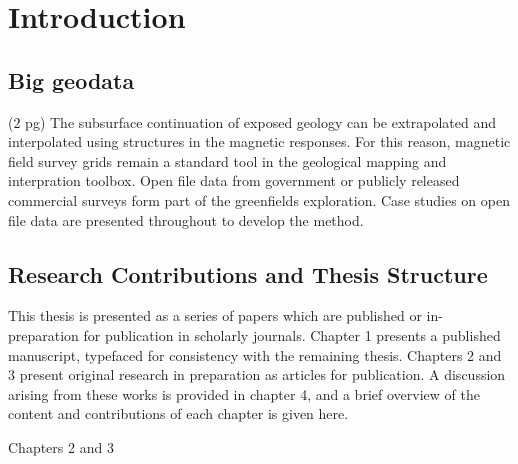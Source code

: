 \documentclass[manuscript.tex]{subfiles}
\begin{document}
\section{Introduction} %
\subsection{Big geodata}
(2 pg)
The subsurface continuation of exposed geology can be extrapolated and interpolated using structures in the magnetic responses.
For this reason, magnetic field survey grids remain a standard tool in the geological mapping and interpration toolbox. 
Open file data from government or publicly released commercial surveys form part of the greenfields exploration.
Case studies on open file data are presented throughout to develop the method.


\subsection{Research Contributions and Thesis Structure}
This thesis is presented as a series of papers which are published or in-preparation for publication in scholarly journals.
Chapter 1 presents a published manuscript, typefaced for consistency with the remaining thesis.
Chapters 2 and 3 present original research in preparation as articles for publication.
A discussion arising from these works is provided in chapter 4, and a brief overview of the content and contributions of each chapter is given here.

Chapters 2 and 3 
\end{document}
